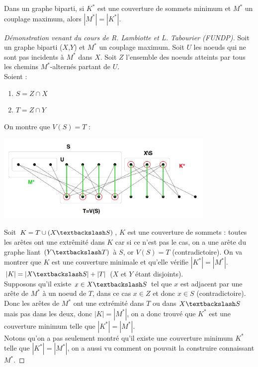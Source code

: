 \begin{mytheo} [König]
  Dans un graphe biparti, si $K^*$ est une couverture de sommets minimum et $M^*$ un couplage maximum, alors $|M^*| = |K^*|$.
  \begin{proof} [Démonstration venant du cours de R. Lambiotte et L. Tabourier  (FUNDP)]
    Soit un graphe biparti ($X$,$Y$) et $M^*$ un couplage maximum. 
    Soit $U$ les noeuds qui ne sont pas incidents à $M^*$ dans $X$.
    Soit $Z$ l'ensemble des noeuds atteints par tous les chemins $M^*$-alternés partant de $U$.\\
    Soient : 
    \begin{enumerate}
      \item $S = Z \cap X$
      \item $T = Z \cap Y$
    \end{enumerate}
    On montre que $V(S) = T$ :
    \begin{center}
      \includegraphics[width=300pt]{../img/konig}
    \end{center}
    Soit $K = T \cup (X \textbackslash S)$, $K$ est une couverture de sommets : toutes les arêtes ont une extrêmité dans $K$ car si ce n'est pas le cas, on a une arête du graphe liant $(Y \textbackslash T)$ à $S$, or $V(S) = T$ (contradictoire). On va montrer que $K$ est une couverture minimale et qu'elle vérifie $|K^*| = |M^*|$.\\
    $|K| = |X \textbackslash S| + |T|$ ($X$ et $Y$ étant disjoints).\\
    Supposons qu'il existe $x \in X \textbackslash S$ tel que $x$ est adjacent par une arête de $M^*$ à un noeud de $T$, dans ce cas $x \in Z$ et donc $x \in S$ (contradictoire). Donc les arêtes de $M^*$ ont une extrémité dans $T$ ou dans $X \textbackslash S$ mais pas dans les deux, donc $|K| = |M^*|$, on a donc trouvé que $K^*$ est une couverture minimum telle que $|K^*| = |M^*|$.\\
    Notons qu'on a pas seulement montré qu'il existe une couverture minimum $K^*$ telle que $|K^*| = |M^*|$, on a aussi vu comment on pouvait la construire connaissant $M^*$.
  \end{proof}
\end{mytheo}


